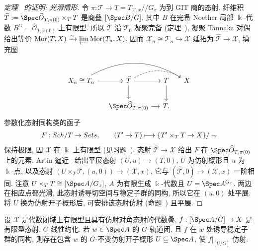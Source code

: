 \begin{proof}[定理~ 的证明: 光滑情形]
令 $\pi:\mathcal T\to T=T_{\mathcal X,x}//G_x$ 为到 GIT 商的态射. 纤维积 $\widehat{\mathcal T}:=\Spec\widehat{\mathcal O}_{T,\pi(0)}\times_T\mathcal T$ 是商叠 $[\Spec B/G]$, 其中 $B$ 在完备 Noether 局部 $\Bbbk$-代数 $B^G=\widehat{\mathcal O}_{T,\pi(0)}$ 上有限型. 所以 $\widehat{\mathcal T}$ 沿 $\mathcal T_0$ 凝聚完备 (定理~), 凝聚 Tannaka 对偶~ 给出等价 $\operatorname{Mor}(\mathcal T,\mathcal X)\xrightarrow{\sim}\varprojlim\operatorname{Mor}(\mathcal T_n,\mathcal X)$. 因而 $\mathcal X_n\cong\mathcal T_n\hookrightarrow\mathcal X$ 延拓为 $\widehat{\mathcal T}\to\mathcal X$, 填充图
\begin{align*}
\begin{tikzcd}[ampersand replacement=\&,column sep=small]
\mathcal X_n\cong\mathcal T_n\arrow[r]\arrow[rrr,bend left]\&\widehat{\mathcal T}\arrow[r]\arrow[rr,dashed,bend left]\arrow[d]\&\mathcal T\arrow[d]\&\mathcal X\\
\&\Spec\widehat{\mathcal O}_{T,\pi(0)}\arrow[r]\&T.\&
\end{tikzcd}
\end{align*}
参数化态射同构类的函子
\begin{align*}
F:\Sch/T\to\Sets,\qquad(T'\to T)\longmapsto\{T'\times_T\mathcal T\to\mathcal X\}/\sim
\end{align*}
保持极限, 因 $\mathcal X$ 在 $\Bbbk$ 上有限型 (见习题~). 态射 $\widehat{\mathcal T}\to\mathcal X$ 给出 $F$ 在 $\Spec\widehat{\mathcal O}_{T,\pi(0)}$ 上的元素. Artin 逼近~ 给出平展态射 $(U,u)\to(T,0)$, $U$ 为仿射概形且 $u$ 为 $\Bbbk$-点, 以及态射 $(U\times_T\mathcal T,(u,0))\to(\mathcal X,x)$, 它与 $(\widehat{\mathcal T},0)\to(\mathcal X,x)$ 一阶相同. 注意 $U\times_T\mathcal T\cong[\Spec A/G_x]$, $A$ 为有限生成 $\Bbbk$-代数且 $U=\Spec A^{G_x}$. 两边在相应点都光滑, 此态射诱导切空间与稳定子群的同构, 所以它在 $(u,0)$ 处平展. 将 $U$ 换为仿射开子概形后, 可安排该态射仿射 (命题~) 且平展.
\end{proof}
\begin{proposition}\label{src:7.7.17}
设 $\mathcal X$ 是代数闭域上有限型且具有仿射对角态射的代数叠, $f:[\Spec A/G]\to\mathcal X$ 是有限型态射, $G$ 线性约化. 若 $w\in\Spec A$ 的 $G$-轨道闭, 且 $f$ 在 $w$ 处诱导稳定子群的同构, 则存在包含 $w$ 的 $G$-不变仿射开子概形 $U\subseteq\Spec A$, 使 $f|_{[U/G]}$ 仿射.
\end{proposition}
